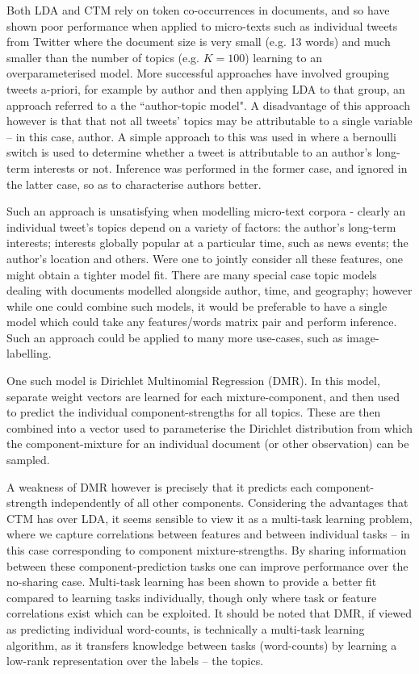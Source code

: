 Both LDA and CTM rely on token co-occurrences in documents, and so have shown poor performance when applied to micro-texts such as individual tweets from Twitter\cite{DeLaRosa2011} where the document size is very small (e.g. 13 words) and much smaller than the number of topics (e.g. $K=100$) learning to an overparameterised model. More successful approaches have involved grouping tweets a-priori, for example by author\cite{Weng2010}\cite{Xu2011}\cite{Hong2010}\cite{Eisenstein2010} and then applying LDA to that group, an approach referred to a the ``author-topic model"\cite{MacCallum2007}. A disadvantage of this approach however is that that not all tweets' topics may be attributable to a single variable -- in this case, author. A simple approach to this was used in \cite{Xu2011} where a bernoulli switch is used to determine whether a tweet is attributable to an author's long-term interests or not. Inference was performed in the former case, and ignored in the latter case, so as to characterise authors better. 

Such an approach is unsatisfying when modelling micro-text corpora - clearly an individual tweet's topics depend on a variety of factors: the author's long-term interests; interests globally popular at a particular time, such as news events; the author's location and others. Were one to jointly consider all these features, one might obtain a tighter model fit. There are many special case topic models dealing with documents modelled alongside author\cite{RosenZvi2004}, time\cite{Wang2006}, and geography\cite{Eisenstein2010}; however while one could combine such models, it would be preferable to have a single model which could take any features/words matrix pair and perform inference. Such an approach could be applied to many more use-cases, such as image-labelling.

One such model is Dirichlet Multinomial Regression (DMR)\cite{Mimno2008}. In this model, separate weight vectors are learned for each mixture-component, and then used to predict the individual component-strengths for all topics. These are then combined into a vector used to parameterise the Dirichlet distribution from which the component-mixture for an individual document (or other observation) can be sampled. 

A weakness of DMR however is precisely that it predicts each component-strength independently of all other components. Considering the advantages that CTM has over LDA, it seems sensible to view it as a multi-task learning problem, where we capture correlations between features and between individual tasks -- in this case corresponding to component mixture-strengths. By sharing information between these component-prediction tasks one can improve performance over the no-sharing case. Multi-task learning has been shown to provide a better fit compared to learning tasks individually\cite{Archambeau2011}\cite{Argyriou2008}, though only where task or feature correlations exist which can be exploited\cite{Caruana1997}. It should be noted that DMR, if viewed as predicting individual word-counts, is technically a multi-task learning algorithm, as it transfers knowledge between tasks (word-counts) by learning a low-rank representation over the labels -- the topics.

